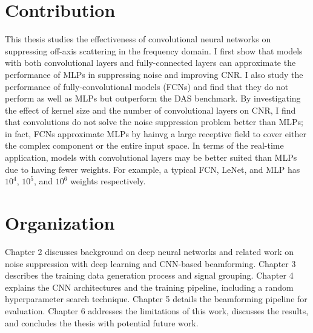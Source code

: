 \section{Contribution} %
This thesis studies the effectiveness of convolutional neural networks on suppressing off-axis scattering in the frequency domain. I first show that models with both convolutional layers and fully-connected layers can approximate the performance of MLPs in suppressing noise and improving CNR. I also study the performance of fully-convolutional models (FCNs) and find that they do not perform as well as MLPs but outperform the DAS benchmark. By investigating the effect of kernel size and the number of convolutional layers on CNR, I find that convolutions do not solve the noise suppression problem better than MLPs; in fact, FCNs approximate MLPs by hainvg a large receptive field to cover either the complex component or the entire input space. In terms of the real-time application, models with convolutional layers may be better suited than MLPs due to having fewer weights. For example, a typical FCN, LeNet, and MLP has $10^4$, $10^5$, and $10^6$ weights respectively.
%


\section{Organization}
Chapter 2 discusses background on deep neural networks and related work on noise suppression with deep learning and CNN-based beamforming. Chapter 3 describes the training data generation process and signal grouping. Chapter 4 explains the CNN architectures and the training pipeline, including a random hyperparameter search technique. Chapter 5 details the beamforming pipeline for evaluation. Chapter 6 addresses the limitations of this work, discusses the results, and concludes the thesis with potential future work.
